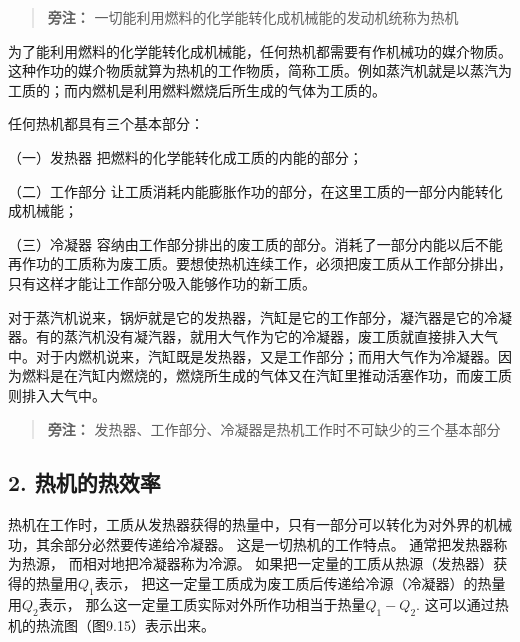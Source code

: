 \begin{quote}
\textbf{旁注：} 一切能利用燃料的化学能转化成机械能的发动机统称为热机
\end{quote}

为了能利用燃料的化学能转化成机械能，任何热机都需要有作机械功的媒介物质。这种作功的媒介物质就算为热机的工作物质，简称工质。例如蒸汽机就是以蒸汽为工质的；而内燃机是利用燃料燃烧后所生成的气体为工质的。

任何热机都具有三个基本部分：

（一）发热器 把燃料的化学能转化成工质的内能的部分；

（二）工作部分
让工质消耗内能膨胀作功的部分，在这里工质的一部分内能转化成机械能；

（三）冷凝器
容纳由工作部分排出的废工质的部分。消耗了一部分内能以后不能再作功的工质称为废工质。要想使热机连续工作，必须把废工质从工作部分排出，只有这样才能让工作部分吸入能够作功的新工质。

对于蒸汽机说来，锅炉就是它的发热器，汽缸是它的工作部分，凝汽器是它的冷凝器。有的蒸汽机没有凝汽器，就用大气作为它的冷凝器，废工质就直接排入大气中。对于内燃机说来，汽缸既是发热器，又是工作部分；而用大气作为冷凝器。因为燃料是在汽缸内燃烧的，燃烧所生成的气体又在汽缸里推动活塞作功，而废工质则排入大气中。

\begin{quote}
\textbf{旁注：}
发热器、工作部分、冷凝器是热机工作时不可缺少的三个基本部分
\end{quote}

\subsection{2. 热机的热效率}\label{ux70edux673aux7684ux70edux6548ux7387}

热机在工作时，工质从发热器获得的热量中，只有一部分可以转化为对外界的机械功，其余部分必然要传递给冷凝器。
这是一切热机的工作特点。 通常把发热器称为热源，
而相对地把冷凝器称为冷源。
如果把一定量的工质从热源（发热器）获得的热量用\(Q_{1}\)表示，
把这一定量工质成为废工质后传递给冷源（冷凝器）的热量用\(Q_{2}\)表示，
那么这一定量工质实际对外所作功相当于热量\(Q_{1} - Q_{2}\).
这可以通过热机的热流图（图9.15）表示出来。


